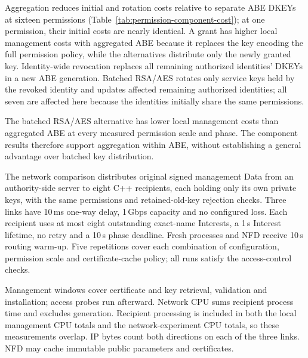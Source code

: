 Aggregation reduces initial and rotation costs relative to separate ABE DKEYs at sixteen permissions (Table~\ref{tab:permission-component-cost}); at one permission, their initial costs are nearly identical. A grant has higher local management costs with aggregated ABE because it replaces the key encoding the full permission policy, while the alternatives distribute only the newly granted key. Identity-wide revocation replaces all remaining authorized identities' DKEYs in a new ABE generation. Batched RSA/AES rotates only service keys held by the revoked identity and updates affected remaining authorized identities; all seven are affected here because the identities initially share the same permissions.

The batched RSA/AES alternative has lower local management costs than aggregated ABE at every measured permission scale and phase. The component results therefore support aggregation within ABE, without establishing a general advantage over batched key distribution.

The network comparison distributes original signed management Data from an authority-side server to eight C++ recipients, each holding only its own private keys, with the same permissions and retained-old-key rejection checks. Three links have 10\,ms one-way delay, 1\,Gbps capacity and no configured loss. Each recipient uses at most eight outstanding exact-name Interests, a 1\,s Interest lifetime, no retry and a 10\,s phase deadline. Fresh processes and NFD receive 10\,s routing warm-up. Five repetitions cover each combination of configuration, permission scale and certificate-cache policy; all runs satisfy the access-control checks.

Management windows cover certificate and key retrieval, validation and installation; access probes run afterward. Network CPU sums recipient process time and excludes generation. Recipient processing is included in both the local management CPU totals and the network-experiment CPU totals, so these measurements overlap. IP bytes count both directions on each of the three links. NFD may cache immutable public parameters and certificates.

